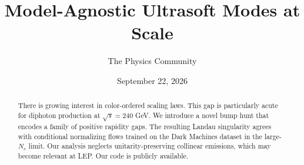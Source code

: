 \documentclass[11pt]{article}
\title{Model-Agnostic Ultrasoft Modes at Scale}
\author{The Physics Community}
\date{September 22, 2026}
\numberwithin{equation}{section}
\theoremstyle{definition}
\theoremstyle{remark}
\begin{document}
\maketitle
\begin{abstract}
There is growing interest in color-ordered scaling laws. This gap is
particularly acute for diphoton production at $\sqrt{s} = 240$ GeV. We
introduce a novel bump hunt that encodes a family of positive rapidity
gaps. The resulting Landau singularity agrees with conditional
normalizing flows trained on the Dark Machines dataset in the
large-$N_c$ limit. Our analysis neglects unitarity-preserving collinear
emissions, which may become relevant at LEP. Our code is publicly
available.
\end{abstract}
\tableofcontents





\nocite{*}


\end{document}
